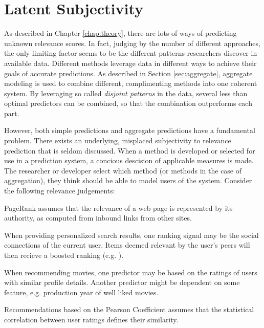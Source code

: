 \section{Latent Subjectivity}
\label{sec:reasoning}

As described in Chapter \ref{chap:theory}, 
there are lots of ways of predicting unknown relevance scores. 
In fact, judging by the number of different approaches,
the only limiting factor seems to be the different 
patterns researchers discover in available data.
Different methods leverage data in different ways
to achieve their goals of accurate predictions.
As described in Section \ref{sec:aggregate},
aggregate modeling is used to combine different, complimenting
methods into one coherent system.
By leveraging so called \emph{disjoint patterns}
in the data, several less than optimal predictors
can be combined, so that the combination outperforms each part.

However, both simple predictions and aggregate predictions have a fundamental problem.
There exists an underlying, misplaced subjectivity to relevance prediction that is seldom discussed.
When a method is developed or selected for use in a prediction system,
a concious descision of applicable measures is made.
The researcher or developer select which method (or methods in the case of aggregation),
they think should be able to model users of the system.
Consider the following relevance judgements:

\begin{itemize*}
  \item PageRank \citep{Bender2005} assumes that the relevance of a web page is 
  represented by its authority, as computed from inbound links from other sites.
  \item When providing personalized search results, one ranking signal may be 
  the social connections of the current user. Items deemed relevant by the user's 
  peers will then recieve a boosted ranking (e.g. \cite{Carmel2009}).
  \item When recommending movies, one predictor may be based on the ratings
  of users with similar profile details. Another predictor might be 
  dependent on some feature, e.g. production year of well liked movies.
  \item Recommendations based on the Pearson Coefficient \cite[p11]{Segaran2007}
  assumes that the statistical correlation between user ratings defines their 
  similarity.
\end{itemize*}

